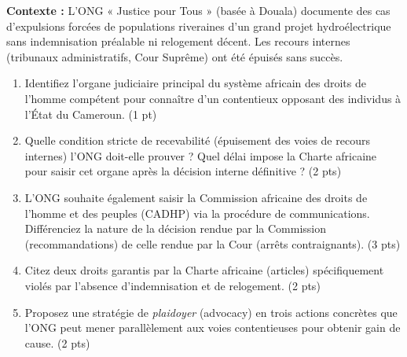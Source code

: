 \documentclass[11pt]{article}
\begin{document}
\begin{exercice}
\label{exo:africain}
\textbf{Contexte :} L'ONG « Justice pour Tous » (basée à Douala) documente des cas d'expulsions forcées de populations riveraines d'un grand projet hydroélectrique sans indemnisation préalable ni relogement décent. Les recours internes (tribunaux administratifs, Cour Suprême) ont été épuisés sans succès.
\begin{enumerate}
    \item Identifiez l'organe judiciaire principal du système africain des droits de l'homme compétent pour connaître d'un contentieux opposant des individus à l'État du Cameroun. \hfill (1 pt)
    \item Quelle condition stricte de recevabilité (épuisement des voies de recours internes) l'ONG doit-elle prouver ? Quel délai impose la Charte africaine pour saisir cet organe après la décision interne définitive ? \hfill (2 pts)
    \item L'ONG souhaite également saisir la Commission africaine des droits de l'homme et des peuples (CADHP) via la procédure de communications. Différenciez la nature de la décision rendue par la Commission (recommandations) de celle rendue par la Cour (arrêts contraignants). \hfill (3 pts)
    \item Citez deux droits garantis par la Charte africaine (articles) spécifiquement violés par l'absence d'indemnisation et de relogement. \hfill (2 pts)
    \item Proposez une stratégie de \emph{plaidoyer} (advocacy) en trois actions concrètes que l'ONG peut mener parallèlement aux voies contentieuses pour obtenir gain de cause. \hfill (2 pts)
\end{enumerate}
\end{exercice}
\end{document}
